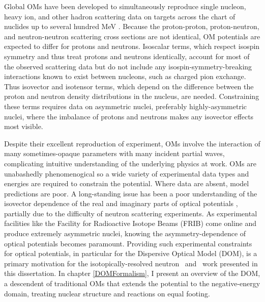Global OMs have been developed to simultaneously reproduce single nucleon, heavy ion,
and other hadron scattering data on targets across the chart of nuclides up to several
hundred MeV \cite{CH89, KoningDelaroche}. Because the proton-proton,
proton-neutron, and neutron-neutron scattering cross sections
are not identical, OM potentials are expected to differ for protons and
neutrons. Isoscalar terms, which respect isospin symmetry and thus treat protons and neutrons 
identically, account for most of the observed scattering data but do not include
any isospin-symmetry-breaking interactions known to exist between
nucleons, such as charged pion exchange. Thus isovector and isotensor terms,
which depend on the difference between the proton and neutron density
distributions in the nucleus, are needed. Constraining these terms requires data
on asymmetric nuclei, preferably highly-asymmetric nuclei, where the imbalance
of protons and neutrons makes any isovector effects most visible.

Despite their excellent reproduction of experiment, OMs involve the interaction of
many sometimes-opaque parameters with many incident
partial waves, complicating intuitive understanding of the underlying physics at work.
OMs are unabashedly phenomenogical so a wide variety of
experimental data types and energies are required to constrain the potential.
Where data are absent, model predictions are poor. A long-standing issue has
been a poor understanding of the isovector dependence of the real and
imaginary parts of optical potentials \cite{Holt16}, partially due to the
difficulty of neutron scattering experiments. As experimental facilities like
the Facility for Radioactive Isotope Beams (FRIB) come online and produce
extremely asymmetric nuclei, knowing the asymmetry-dependence of optical
potentials becomes paramount. Providing such experimental constraints for optical
potentials, in particular for the Dispersive Optical Model (DOM), is a primary 
motivation for the isotopically-resolved neutron \tot\ and \el\ work presented in this 
dissertation. In chapter \ref{DOMFormalism}, I present an overview of the DOM, a descendent of 
traditional OMs that extends the potential to the negative-energy domain, treating
nuclear structure and reactions on equal footing. 


